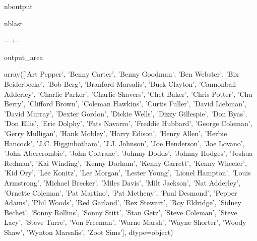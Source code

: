 \documentclass[letterpaper,10pt,english]{sphinxmanual}
\newlength\nbsphinxcodecellspacing
\begin{document}
\begin{sphinxuseclass}{nboutput}
\begin{sphinxuseclass}{nblast}
{

\kern-\sphinxverbatimsmallskipamount\kern-\baselineskip
\kern+\FrameHeightAdjust\kern-\fboxrule
\vspace{\nbsphinxcodecellspacing}

\begin{sphinxuseclass}{output_area}
\begin{sphinxuseclass}{}


\begin{sphinxVerbatim}[commandchars=\\\{\}]
\llap{\color{nbsphinxout}[62]:\,\hspace{\fboxrule}\hspace{\fboxsep}}array(['Art Pepper', 'Benny Carter', 'Benny Goodman', 'Ben Webster',
       'Bix Beiderbecke', 'Bob Berg', 'Branford Marsalis', 'Buck Clayton',
       'Cannonball Adderley', 'Charlie Parker', 'Charlie Shavers',
       'Chet Baker', 'Chris Potter', 'Chu Berry', 'Clifford Brown',
       'Coleman Hawkins', 'Curtis Fuller', 'David Liebman',
       'David Murray', 'Dexter Gordon', 'Dickie Wells', 'Dizzy Gillespie',
       'Don Byas', 'Don Ellis', 'Eric Dolphy', 'Fats Navarro',
       'Freddie Hubbard', 'George Coleman', 'Gerry Mulligan',
       'Hank Mobley', 'Harry Edison', 'Henry Allen', 'Herbie Hancock',
       'J.C. Higginbotham', 'J.J. Johnson', 'Joe Henderson', 'Joe Lovano',
       'John Abercrombie', 'John Coltrane', 'Johnny Dodds',
       'Johnny Hodges', 'Joshua Redman', 'Kai Winding', 'Kenny Dorham',
       'Kenny Garrett', 'Kenny Wheeler', 'Kid Ory', 'Lee Konitz',
       'Lee Morgan', 'Lester Young', 'Lionel Hampton', 'Louis Armstrong',
       'Michael Brecker', 'Miles Davis', 'Milt Jackson', 'Nat Adderley',
       'Ornette Coleman', 'Pat Martino', 'Pat Metheny', 'Paul Desmond',
       'Pepper Adams', 'Phil Woods', 'Red Garland', 'Rex Stewart',
       'Roy Eldridge', 'Sidney Bechet', 'Sonny Rollins', 'Sonny Stitt',
       'Stan Getz', 'Steve Coleman', 'Steve Lacy', 'Steve Turre',
       'Von Freeman', 'Warne Marsh', 'Wayne Shorter', 'Woody Shaw',
       'Wynton Marsalis', 'Zoot Sims'], dtype=object)
\end{sphinxVerbatim}



\end{sphinxuseclass}
\end{sphinxuseclass}
}

\end{sphinxuseclass}
\end{sphinxuseclass}
\end{document}
